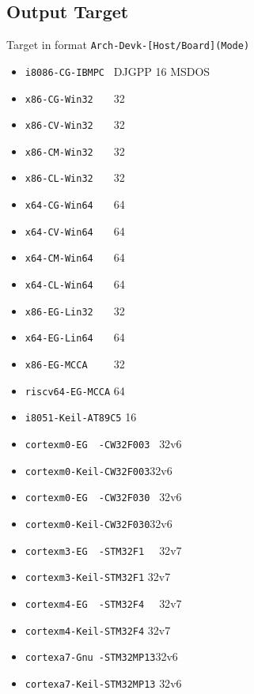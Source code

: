 
\subsection{Output Target}

Target in format \verb`Arch-Devk-[Host/Board](Mode)`
\begin{itemize}
\item \verb`i8086-CG-IBMPC ` {DJGPP 16 MSDOS}
\item \verb`x86-CG-Win32   ` {32} %
\item \verb`x86-CV-Win32   ` {32} %
\item \verb`x86-CM-Win32   ` {32}
\item \verb`x86-CL-Win32   ` {32}

\item \verb`x64-CG-Win64   ` {64} %
\item \verb`x64-CV-Win64   ` {64} %
\item \verb`x64-CM-Win64   ` {64}
\item \verb`x64-CL-Win64   ` {64}

\item \verb`x86-EG-Lin32   ` {32} %
\item \verb`x64-EG-Lin64   ` {64} %
\item \verb`x86-EG-MCCA    ` {32} %
\item \verb`riscv64-EG-MCCA` {64}
\item \verb`i8051-Keil-AT89C5` {16}

\item \verb`cortexm0-EG  -CW32F003 ` {32}v6
\item \verb`cortexm0-Keil-CW32F003`{32}v6
\item \verb`cortexm0-EG  -CW32F030 ` {32}v6
\item \verb`cortexm0-Keil-CW32F030`{32}v6

\item \verb`cortexm3-EG  -STM32F1  ` {32}v7
\item \verb`cortexm3-Keil-STM32F1` {32}v7

\item \verb`cortexm4-EG  -STM32F4  ` {32}v7
\item \verb`cortexm4-Keil-STM32F4` {32}v7

\item \verb`cortexa7-Gnu -STM32MP13`{32}v6 %
\item \verb`cortexa7-Keil-STM32MP13` {32}v6
\end{itemize}


